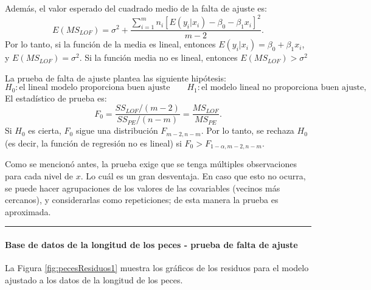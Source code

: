 \documentclass[
]{article}
\newenvironment{Shaded}{\begin{snugshade}}{\end{snugshade}}
\newcommand{\AttributeTok}[1]{\textcolor[rgb]{0.13,0.29,0.53}{#1}}
\newcommand{\DecValTok}[1]{\textcolor[rgb]{0.00,0.00,0.81}{#1}}
\newcommand{\FunctionTok}[1]{\textcolor[rgb]{0.13,0.29,0.53}{\textbf{#1}}}
\newcommand{\NormalTok}[1]{#1}
\newcommand{\OtherTok}[1]{\textcolor[rgb]{0.56,0.35,0.01}{#1}}
\newcommand{\SpecialCharTok}[1]{\textcolor[rgb]{0.81,0.36,0.00}{\textbf{#1}}}
\newcommand{\StringTok}[1]{\textcolor[rgb]{0.31,0.60,0.02}{#1}}
\begin{document}
Además, el valor esperado del cuadrado medio de la falta de ajuste es:
\[
E(MS_{LOF}) = \sigma^{2} + \frac{\sum_{i=1}^{m}n_{i}\left[ E(y_{i}|x_{i}) - \beta_{0}-\beta_{1}x_{i} \right]^{2}}{m-2}.
\]
Por lo tanto, si la función de la media es lineal, entonces \(E(y_{i}|x_{i}) = \beta_{0}+\beta_{1}x_{i}\), y \(E(MS_{LOF}) = \sigma^{2}\). Si la función media no es lineal, entonces \(E(MS_{LOF}) > \sigma^{2}\)

La prueba de falta de ajuste plantea las siguiente hipótesis:
\[
H_{0}: \mbox{el lineal modelo proporciona buen ajuste} \qquad H_{1}: \mbox{el modelo lineal no proporciona buen ajuste},
\]
El estadístico de prueba es:
\[
F_{0}=\frac{SS_{LOF}/(m-2)}{SS_{PE}/(n-m)} = \frac{MS_{LOF}}{MS_{PE}}.
\]
Si \(H_{0}\) es cierta, \(F_{0}\) sigue una distribución \(F_{m-2,n-m}\). Por lo tanto, se rechaza \(H_{0}\) (es decir, la función de regresión no es lineal) si \(F_{0} > F_{1-\alpha,m-2,n-m}\).

Como se mencionó antes, la prueba exige que se tenga múltiples observaciones para cada nivel de \(x\). Lo cuál es un gran desventaja. En caso que esto no ocurra, se puede hacer agrupaciones de los valores de las covariables (vecinos más cercanos), y considerarlas como repeticiones; de esta manera la prueba es aproximada.

\rule{\textwidth}{0.4pt}

\hypertarget{base-de-datos-de-la-longitud-de-los-peces---prueba-de-falta-de-ajuste}{%
\paragraph{Base de datos de la longitud de los peces - prueba de falta de ajuste}\label{base-de-datos-de-la-longitud-de-los-peces---prueba-de-falta-de-ajuste}}

La Figura \ref{fig:pecesResiduos1} muestra los gráficos de los residuos para el modelo ajustado a los datos de la longitud de los peces.

\begin{Shaded}
\end{Shaded}
\end{document}
